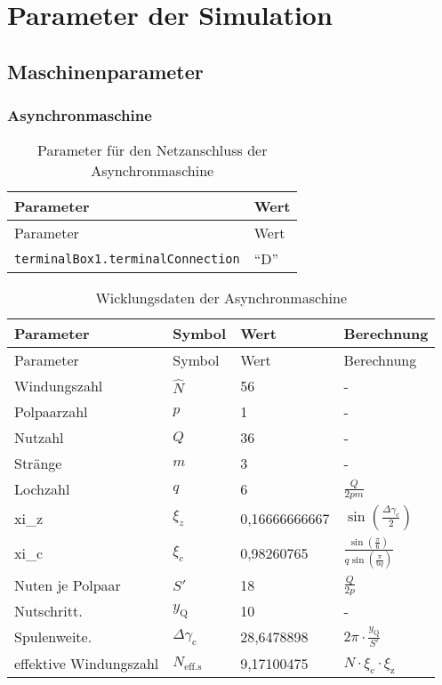 \chapter{Parameter der Simulation}
\label{chap:ParameterDerSimulation}

\section{Maschinenparameter}\label{sec:maschinenparameter}

\subsection{Asynchronmaschine}\label{subsec:asynchronmaschine}


\begin{longtable}[]{@{}ll@{}}
\caption{Parameter für den Netzanschluss der
Asynchronmaschine}\tabularnewline
\toprule
Parameter & Wert\tabularnewline
\midrule
\endfirsthead
\toprule
Parameter & Wert\tabularnewline
\midrule
\endhead
\texttt{terminalBox1.terminalConnection} & ``D''\tabularnewline
\bottomrule
\end{longtable}

\begin{longtable}[]{@{}llll@{}}
\caption{Wicklungsdaten der Asynchronmaschine}\label{tab:WicklungsdatenASM}\tabularnewline
\toprule
Parameter              & Symbol                    & Wert          & Berechnung\tabularnewline
\midrule
\endfirsthead
\toprule
Parameter              & Symbol                    & Wert          & Berechnung\tabularnewline
\midrule
\endhead
Windungszahl           & $\hat N$                  & 56            & -\tabularnewline
Polpaarzahl            & $p$                       & 1             & -\tabularnewline
Nutzahl                & $Q$                       & 36            & -\tabularnewline
Stränge                & $m$                       & 3             & -\tabularnewline
Lochzahl               & $q$                       & 6             & $\frac{Q}{2pm}$\tabularnewline
xi\_z                  & $\xi_z$                   & 0,16666666667 & $\sin(\frac{\Delta\gamma _{\mathrm{c}}}{2})$\tabularnewline
xi\_c                  & $\xi_c$                   & 0,98260765    & $\frac{\sin(\frac{\pi}{6})}{q\sin(\frac{\pi}{6q})}$\tabularnewline
Nuten je Polpaar       & $S'$                      & 18            & $\frac{Q}{2p}$\tabularnewline
Nutschritt.            & $y_\mathrm{Q}$            & 10            & -\tabularnewline
Spulenweite.           & $\Delta\gamma_\mathrm{c}$ & 28,6478898    & $2\pi\cdot\frac{y_\mathrm{Q}}{S'}$\tabularnewline
effektive Windungszahl & $N_\mathrm{eff.s}$        & 9,17100475    & $\hat N\cdot\xi_\mathrm{c}\cdot\xi_\mathrm{z}$\tabularnewline
\bottomrule
\end{longtable}


